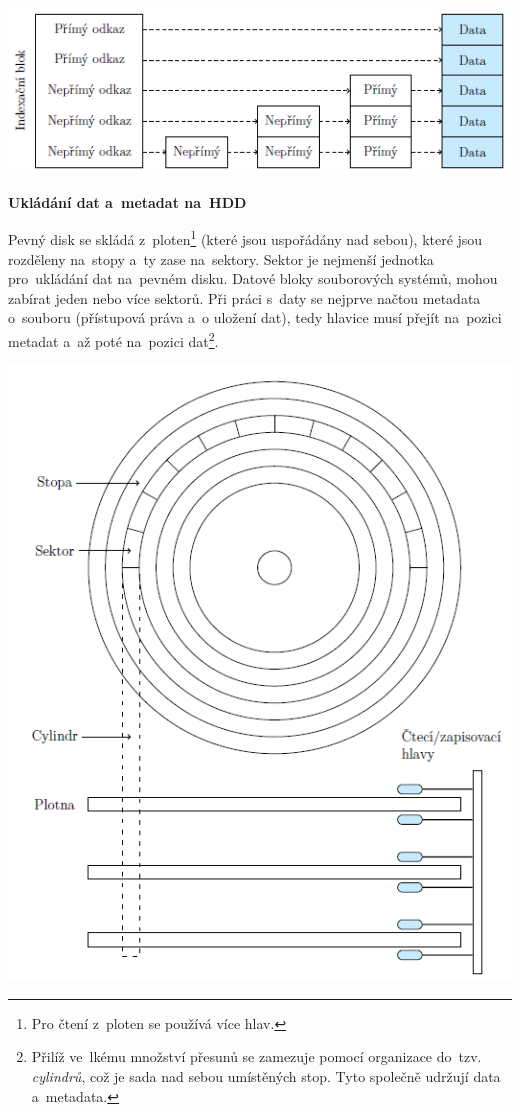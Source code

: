 \begin{center}
    \includegraphics[scale=1.2]{images/mem_block_index.png}
\end{center}

\begin{Large}
    \vspace{0,5cm}
    \textbf{Ukládání dat a~metadat na~HDD}
\end{Large}

Pevný disk se skládá z~ploten\footnote{Pro čtení z~ploten se používá více hlav.} (které jsou uspořádány nad sebou), které jsou rozděleny na~stopy a~ty zase na~sektory. Sektor je nejmenší jednotka pro~ukládání dat na~pevném disku. Datové bloky souborových systémů, mohou zabírat jeden nebo více sektorů. Při práci s~daty se nejprve načtou metadata o~souboru (přístupová práva a~o uložení dat), tedy hlavice musí přejít na~pozici metadat a~až poté na~pozici dat\footnote{Přilíž ve~lkému množství přesunů se zamezuje pomocí organizace do~tzv. \emph{cylindrů}, což je sada nad sebou umístěných stop. Tyto společně udržují data a~metadata.}.  

\begin{center}
    \includegraphics[scale=1]{images/mem_hdd.png}
\end{center}

